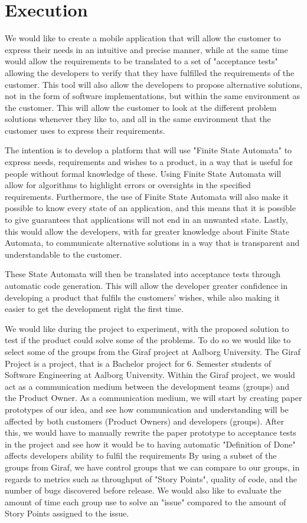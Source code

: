 \section{Execution}
We would like to create a mobile application that will allow the customer to express their needs in an intuitive and precise manner, while at the same time would allow the requirements to be translated to a set of "acceptance tests" allowing the developers to verify that they have fulfilled the requirements of the customer.
This tool will also allow the developers to propose alternative solutions, not in the form of software implementations, but within the same environment as the customer. 
This will allow the customer to look at the different problem solutions whenever they like to, and all in the same environment that the customer uses to express their requirements. 


The intention is to develop a platform that will use "Finite State Automata" to express needs, requirements and wishes to a product, in a way that is useful for people without formal knowledge of these. 
Using Finite State Automata will allow for algorithms to highlight errors or oversights in the specified requirements.
Furthermore, the use of Finite State Automata will also make it possible to know every state of an application, and this means that it is possible to give guarantees that applications will not end in an unwanted state. 
Lastly, this would allow the developers, with far greater knowledge about Finite State Automata, to communicate alternative solutions in a way that is transparent and understandable to the customer. 

These State Automata will then be translated into acceptance tests through automatic code generation.
This will allow the developer greater confidence in developing a product that fulfils the customers' wishes, while also making it easier to get the development right the first time.


We would like during the project to experiment, with the proposed solution to test if the product could solve some of the problems.
To do so we would like to select some of the groups from the Giraf project at Aalborg University.
The Giraf Project is a project, that is a Bachelor project for 6. Semester students of Software Engineering at Aalborg University. 
Within the Giraf project, we would act as a communication medium between the development teams (groups) and the Product Owner.
As a communication medium, we will start by creating paper prototypes of our idea, and see how communication and understanding will be affected by both customers (Product Owners) and developers (groups).
After this, we would have to manually rewrite the paper prototype to acceptance tests in the project and see how it would be to having automatic "Definition of Done" affects developers ability to fulfil the requirements
By using a subset of the groups from Giraf, we have control groups that we can compare to our groups, in regards to metrics such as throughput of "Story Points", quality of code, and the number of bugs discovered before release.
We would also like to evaluate the amount of time each group use to solve an "issue" compared to the amount of Story Points assigned to the issue.


